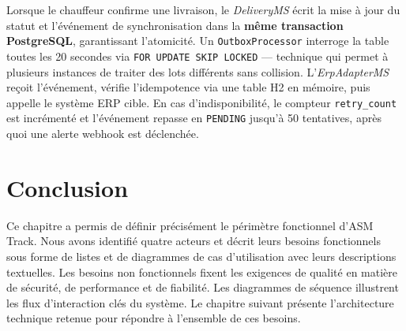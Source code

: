 Lorsque le chauffeur confirme une livraison, le \textit{DeliveryMS} écrit la mise à jour
du statut et l'événement de synchronisation dans la \textbf{même transaction PostgreSQL},
garantissant l'atomicité. Un \texttt{OutboxProcessor} interroge la table toutes les 20
secondes via \texttt{FOR UPDATE SKIP LOCKED} — technique qui permet à plusieurs instances
de traiter des lots différents sans collision. L'\textit{ErpAdapterMS} reçoit l'événement,
vérifie l'idempotence via une table H2 en mémoire, puis appelle le système ERP cible.
En cas d'indisponibilité, le compteur \texttt{retry\_count} est incrémenté et l'événement
repasse en \texttt{PENDING} jusqu'à 50 tentatives, après quoi une alerte webhook est déclenchée.

\section{Conclusion}

Ce chapitre a permis de définir précisément le périmètre fonctionnel d'ASM Track.
Nous avons identifié quatre acteurs et décrit leurs besoins fonctionnels sous forme
de listes et de diagrammes de cas d'utilisation avec leurs descriptions textuelles.
Les besoins non fonctionnels fixent les exigences de qualité en matière de sécurité,
de performance et de fiabilité. Les diagrammes de séquence illustrent les flux
d'interaction clés du système. Le chapitre suivant présente l'architecture technique
retenue pour répondre à l'ensemble de ces besoins.

